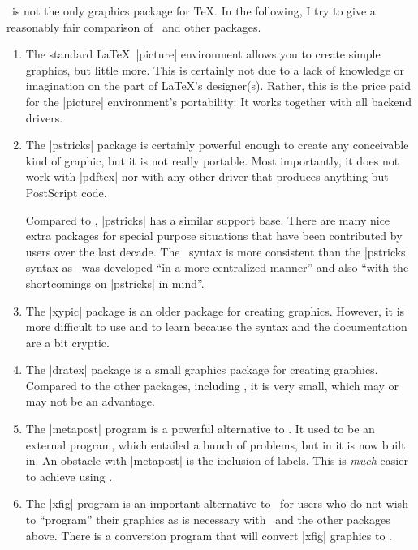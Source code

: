 \tikzname\ is not the only graphics package for \TeX. In the following, I try
to give a reasonably fair comparison of \tikzname\ and other packages.
%
\begin{enumerate}
    \item The standard \LaTeX\ |{picture}| environment allows you to create
        simple graphics, but little more. This is certainly not due to a lack
        of knowledge or imagination on the part of \LaTeX's designer(s).
        Rather, this is the price paid for the |{picture}| environment's
        portability: It works together with all backend drivers.
    \item The |pstricks| package is certainly powerful enough to create any
        conceivable kind of graphic, but it is not really portable. Most
        importantly, it does not work with |pdftex| nor with any other driver
        that produces anything but PostScript code.

        Compared to \tikzname, |pstricks| has a similar support base. There
        are many nice extra packages for special purpose situations that have
        been contributed by users over the last decade. The \tikzname\ syntax
        is more consistent than the |pstricks| syntax as \tikzname\ was
        developed ``in a more centralized manner'' and also ``with the
        shortcomings on |pstricks| in mind''.
    \item The |xypic| package is an older package for creating graphics.
        However, it is more difficult to use and to learn because the syntax
        and the documentation are a bit cryptic.
    \item The |dratex| package is a small graphics package for creating
        graphics. Compared to the other packages, including \tikzname, it is
        very small, which may or may not be an advantage.
    \item The |metapost| program is a powerful alternative to \tikzname. It
        used to be an external program, which entailed a bunch of problems,
        but in  it is now built in. An obstacle with |metapost| is
        the inclusion of labels. This is \emph{much} easier to achieve using
        \pgfname.
    \item The |xfig| program is an important alternative to \tikzname\ for
        users who do not wish to ``program'' their graphics as is necessary
        with \tikzname\ and the other packages above. There is a conversion
        program that will convert |xfig| graphics to \tikzname.
\end{enumerate}


